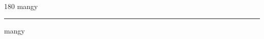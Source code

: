 
\begin{frame}
\begin{center}
\begin{turn}{180}
{\fontsize{2.5cm}{1em}\selectfont mangy}
\end{turn}
\vspace{1em}\par  
\hrule
\vspace{1em}\par  
{\fontsize{2.5cm}{1em}\selectfont mangy}
\end{center}
\end{frame}

